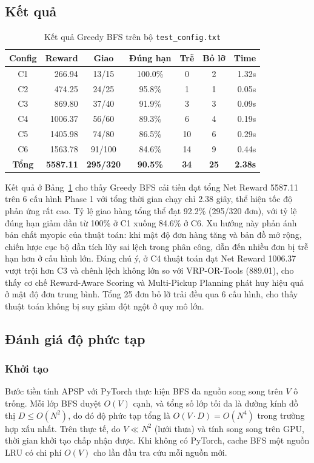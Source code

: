 \documentclass[conference]{IEEEtran}
\begin{document}
\subsection{Kết quả}
\begin{table}[htbp]
\caption{Kết quả Greedy BFS trên bộ \texttt{test\_config.txt}}
\label{tab:greedy-phase1}
\centering
\footnotesize
\begin{tabular}{|c|r|c|c|c|c|r|}
\hline
\textbf{Config} & \textbf{Reward} & \textbf{Giao} & \textbf{Đúng hạn} & \textbf{Trễ} & \textbf{Bỏ lỡ} & \textbf{Time} \\
\hline
C1 & 266.94 & 13/15 & 100.0\% & 0 & 2 & 1.32s \\
C2 & 474.25 & 24/25 &  95.8\% & 1 & 1 & 0.05s \\
C3 & 869.80 & 37/40 &  91.9\% & 3 & 3 & 0.09s \\
C4 & 1006.37 & 56/60 & 89.3\% & 6 & 4 & 0.19s \\
C5 & 1405.98 & 74/80 & 86.5\% & 10 & 6 & 0.29s \\
C6 & 1563.78 & 91/100 & 84.6\% & 14 & 9 & 0.44s \\
\hline
\textbf{Tổng} & \textbf{5587.11} & \textbf{295/320} & \textbf{90.5\%} & \textbf{34} & \textbf{25} & \textbf{2.38s} \\
\hline
\end{tabular}
\end{table}
 
Kết quả ở Bảng~\ref{tab:greedy-phase1} cho thấy Greedy BFS cải tiến đạt tổng Net Reward 5587.11 trên 6 cấu hình Phase 1 với tổng thời gian chạy chỉ 2.38 giây, thể hiện tốc độ phản ứng rất cao. Tỷ lệ giao hàng tổng thể đạt 92.2\% (295/320 đơn), với tỷ lệ đúng hạn giảm dần từ 100\% ở C1 xuống 84.6\% ở C6. Xu hướng này phản ánh bản chất myopic của thuật toán: khi mật độ đơn hàng tăng và bản đồ mở rộng, chiến lược cục bộ dần tích lũy sai lệch trong phân công, dẫn đến nhiều đơn bị trễ hạn hơn ở cấu hình lớn. Đáng chú ý, ở C4 thuật toán đạt Net Reward 1006.37 vượt trội hơn C3 và chênh lệch không lớn so với VRP-OR-Tools (889.01), cho thấy cơ chế Reward-Aware Scoring và Multi-Pickup Planning phát huy hiệu quả ở mật độ đơn trung bình. Tổng 25 đơn bỏ lỡ trải đều qua 6 cấu hình, cho thấy thuật toán không bị suy giảm đột ngột ở quy mô lớn.

\subsection{Đánh giá độ phức tạp}
 
\subsubsection{Khởi tạo}
Bước tiền tính APSP với PyTorch thực hiện BFS đa nguồn song song trên $V$ ô trống. Mỗi lớp BFS duyệt $O(V)$ cạnh, và tổng số lớp tối đa là đường kính đồ thị $D \le O(N^2)$, do đó độ phức tạp tổng là $O(V \cdot D) = O(N^4)$ trong trường hợp xấu nhất. Trên thực tế, do $V \ll N^2$ (lưới thưa) và tính song song trên GPU, thời gian khởi tạo chấp nhận được. Khi không có PyTorch, cache BFS một nguồn LRU có chi phí $O(V)$ cho lần đầu tra cứu mỗi nguồn mới.
 
\end{document}
